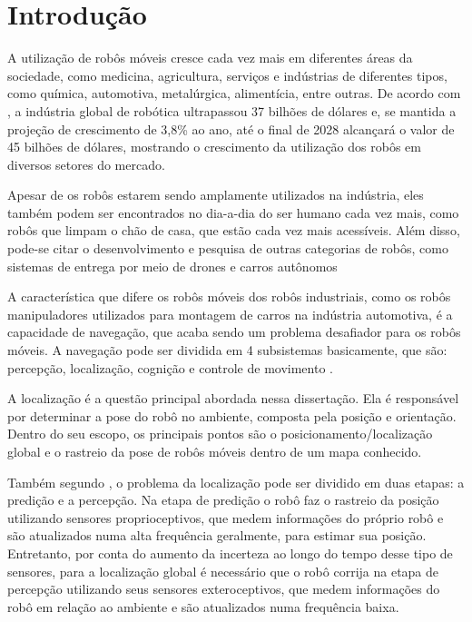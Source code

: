 \documentclass[acronym, symbols, table, deposito]{fei}
\begin{document}
\chapter{Introdução}

	A utilização de robôs móveis cresce cada vez mais em diferentes áreas da sociedade, como medicina, agricultura, serviços e indústrias de diferentes tipos, como química, automotiva, metalúrgica, alimentícia, entre outras. De acordo com \textcite{robotics_market}, a indústria global de robótica ultrapassou 37 bilhões de dólares e, se mantida a projeção de crescimento de 3,8\% ao ano, até o final de 2028 alcançará o valor de 45 bilhões de dólares, mostrando o crescimento da utilização dos robôs em diversos setores do mercado.
	
	Apesar de os robôs estarem sendo amplamente utilizados na indústria, eles também podem ser encontrados no dia-a-dia do ser humano cada vez mais, como robôs que limpam o chão de casa, que estão cada vez mais acessíveis. Além disso, pode-se citar o desenvolvimento e pesquisa de outras categorias de robôs, como sistemas de entrega por meio de drones \cite{su14010360} e carros autônomos \cite{parekh2022review}
	
	A característica que difere os robôs móveis dos robôs industriais, como os robôs manipuladores utilizados para montagem de carros na indústria automotiva, é a capacidade de navegação, que acaba sendo um problema desafiador para os robôs móveis. A navegação pode ser dividida em 4 subsistemas basicamente, que são: percepção, localização, cognição e controle de movimento \cite{siegwart2011introduction}.
	
	A localização é a questão principal abordada nessa dissertação. Ela é responsável por determinar a pose do robô no ambiente, composta pela posição e orientação. Dentro do seu escopo, os principais pontos são o posicionamento/localização global e o rastreio da pose de robôs móveis dentro de um mapa conhecido.
	
	Também segundo \textcite{PANIGRAHI20226019}, o problema da localização pode ser dividido em duas etapas: a predição e a percepção. Na etapa de predição o robô faz o rastreio da posição utilizando sensores proprioceptivos, que medem informações do próprio robô e são atualizados numa alta frequência geralmente, para estimar sua posição. Entretanto, por conta do aumento da incerteza ao longo do tempo desse tipo de sensores, para a localização global é necessário que o robô corrija na etapa de percepção utilizando seus sensores exteroceptivos, que medem informações do robô em relação ao ambiente e são atualizados numa frequência baixa.
	
\end{document}
